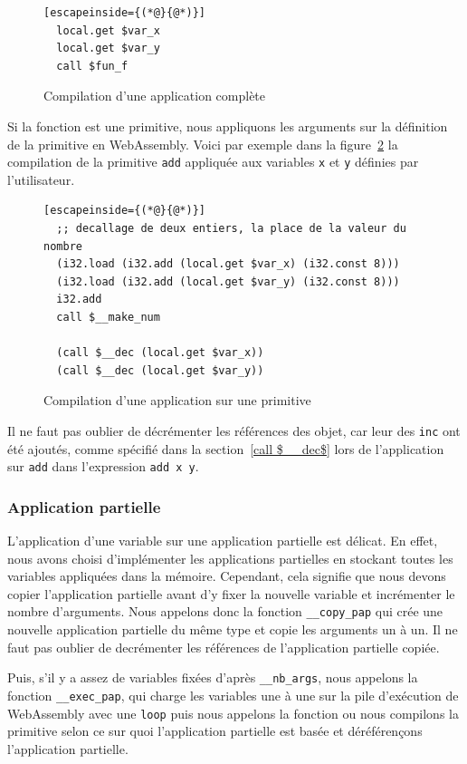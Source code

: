 \documentclass{rapportECL}
\begin{document}
\begin{figure}[H]
	\begin{lstlisting}[escapeinside={(*@}{@*)}]
  local.get $var_x
  local.get $var_y
  call $fun_f
	\end{lstlisting}
	\caption{Compilation d'une application complète}
	\label{listing:compile_app_comp_const}
\end{figure}

Si la fonction est une primitive, nous appliquons les arguments sur la définition de la primitive en WebAssembly.
Voici par exemple dans la figure~\ref{listing:compile_add} la compilation de la primitive \verb|add| appliquée aux variables 
\verb|x| et \verb|y| définies par l'utilisateur.

\begin{figure}[H]
	\begin{lstlisting}[escapeinside={(*@}{@*)}]
  ;; decallage de deux entiers, la place de la valeur du nombre
  (i32.load (i32.add (local.get $var_x) (i32.const 8)))
  (i32.load (i32.add (local.get $var_y) (i32.const 8)))
  i32.add
  call $__make_num
  
  (call $__dec (local.get $var_x))
  (call $__dec (local.get $var_y))
	\end{lstlisting}
	\caption{Compilation d'une application sur une primitive}
	\label{listing:compile_add}
\end{figure}

Il ne faut pas oublier de décrémenter les références des objet, car leur des \verb|inc| ont été ajoutés, comme spécifié dans la 
section~\ref{call $__dec$} lors de l'application sur \verb|add| dans l'expression \verb|add x y|.

\subsubsection{Application partielle}

L'application d'une variable sur une application partielle est délicat. En effet, nous avons choisi d'implémenter les applications 
partielles en stockant toutes les variables appliquées dans la mémoire. Cependant, cela signifie que nous devons copier l'application
partielle avant d'y fixer la nouvelle variable et incrémenter le nombre d'arguments. Nous appelons donc la fonction 
\verb|__copy_pap| qui crée une nouvelle application partielle du même type et copie les arguments un à un. Il ne faut pas oublier de 
decrémenter les références de l'application partielle copiée.

Puis, s'il y a assez de variables fixées d'après \verb|__nb_args|, nous appelons la fonction \verb|__exec_pap|, qui charge les 
variables une à une sur la pile d'exécution de WebAssembly avec une \verb|loop| puis nous appelons la fonction ou nous compilons 
la primitive selon ce sur quoi l'application partielle est basée et déréférençons l'application partielle.
\end{document}
